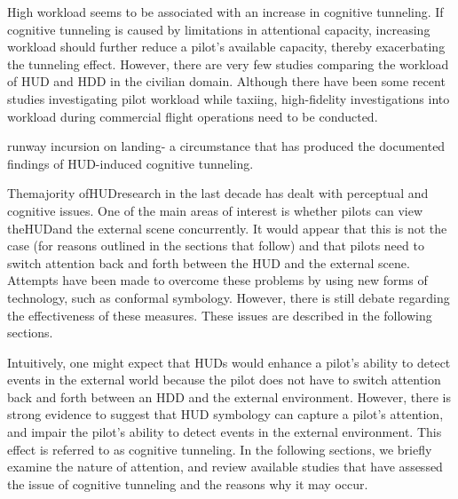 \documentclass[utf8,bachelor,manualbib]{gradu3}
\begin{document}
High workload seems to be associated with an increase in cognitive tunneling. If cognitive tunneling is caused by limitations in attentional capacity, increasing workload should further reduce a pilot’s available capacity, thereby exacerbating the tunneling effect. However, there are very few studies comparing the workload of HUD and HDD in the civilian domain. Although there have been some recent studies investigating pilot workload while taxiing, high-fidelity investigations into workload during commercial flight operations need to be conducted.

runway incursion on landing-
a circumstance that has produced the documented findings of HUD-induced
cognitive tunneling.

Themajority ofHUDresearch in the last decade has dealt with perceptual and cognitive
issues. One of the main areas of interest is whether pilots can view theHUDand
the external scene concurrently. It would appear that this is not the case (for reasons
outlined in the sections that follow) and that pilots need to switch attention back and
forth between the HUD and the external scene. Attempts have been made to overcome
these problems by using new forms of technology, such as conformal
symbology. However, there is still debate regarding the effectiveness of these measures.
These issues are described in the following sections.

Intuitively, one might expect that HUDs would enhance a pilot’s ability to detect
events in the external world because the pilot does not have to switch attention
back and forth between an HDD and the external environment. However, there
is strong evidence to suggest that HUD symbology can capture a pilot’s attention,
and impair the pilot’s ability to detect events in the external environment.
This effect is referred to as cognitive tunneling. In the following sections, we
briefly examine the nature of attention, and review available studies that have
assessed the issue of cognitive tunneling and the reasons why it may occur.
\end{document}
